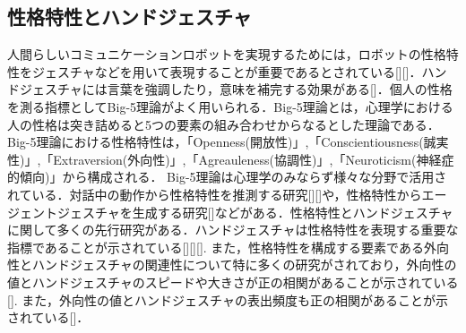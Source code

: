 \subsection{性格特性とハンドジェスチャ}
\label{sec2.3.2}
人間らしいコミュニケーションロボットを実現するためには，ロボットの性格特性をジェスチャなどを用いて表現することが重要であるとされている[][]．ハンドジェスチャには言葉を強調したり，意味を補完する効果がある[]．個人の性格を測る指標としてBig-5理論がよく用いられる．Big-5理論とは，心理学における人の性格は突き詰めると5つの要素の組み合わせからなるとした理論である．Big-5理論における性格特性は，「Openness(開放性)」,「Conscientiousness(誠実性)」,「Extraversion(外向性)」,「Agreauleness(協調性)」,「Neuroticism(神経症的傾向)」から構成される．
Big-5理論は心理学のみならず様々な分野で活用されている．対話中の動作から性格特性を推測する研究[][]や，性格特性からエージェントジェスチャを生成する研究[]などがある．性格特性とハンドジェスチャに関して多くの先行研究がある．ハンドジェスチャは性格特性を表現する重要な指標であることが示されている[][][].
また，性格特性を構成する要素である外向性とハンドジェスチャの関連性について特に多くの研究がされており，外向性の値とハンドジェスチャのスピードや大きさが正の相関があることが示されている[].
また，外向性の値とハンドジェスチャの表出頻度も正の相関があることが示されている[]．






\vspace{1cm}
\begin{figure}[!h]
 \begin{center}
  \centering
  \label{fig:kansei}
 \end{center}
\end{figure}

